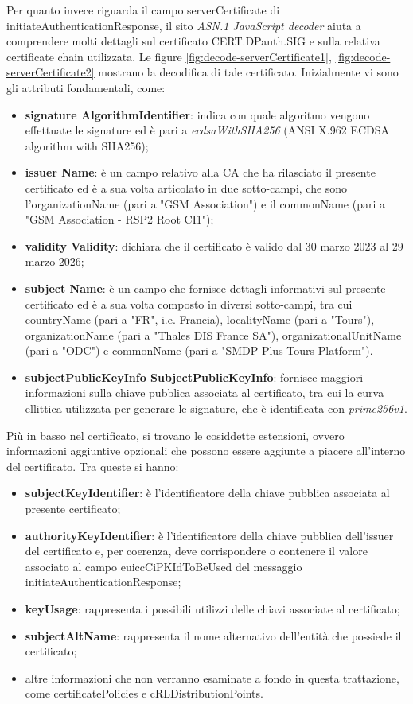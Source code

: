 \documentclass[10pt, oneside]{book}
\begin{document}
Per quanto invece riguarda il campo serverCertificate di initiateAuthenticationResponse, il sito \textit{ASN.1 JavaScript decoder} aiuta a comprendere molti dettagli sul certificato CERT.DPauth.SIG e sulla relativa certificate chain utilizzata. Le figure \ref{fig:decode-serverCertificate1}, \ref{fig:decode-serverCertificate2} mostrano la decodifica di tale certificato. Inizialmente vi sono gli attributi fondamentali, come:
\begin{itemize}
\item \textbf{signature AlgorithmIdentifier}: indica con quale algoritmo vengono effettuate le signature ed è pari a \textit{ecdsaWithSHA256} (ANSI X.962 ECDSA algorithm with SHA256);
\item \textbf{issuer Name}: è un campo relativo alla CA che ha rilasciato il presente certificato ed è a sua volta articolato in due sotto-campi, che sono l'organizationName (pari a "GSM Association") e il commonName (pari a "GSM Association - RSP2 Root CI1");
\item \textbf{validity Validity}: dichiara che il certificato è valido dal 30 marzo 2023 al 29 marzo 2026;
\item \textbf{subject Name}: è un campo che fornisce dettagli informativi sul presente certificato ed è a sua volta composto in diversi sotto-campi, tra cui countryName (pari a "FR", i.e. Francia), localityName (pari a "Tours"), organizationName (pari a "Thales DIS France SA"), organizationalUnitName (pari a "ODC") e commonName (pari a "SMDP Plus Tours Platform").
\item \textbf{subjectPublicKeyInfo SubjectPublicKeyInfo}: fornisce maggiori informazioni sulla chiave pubblica associata al certificato, tra cui la curva ellittica utilizzata per generare le signature, che è identificata con \textit{prime256v1}.
\end{itemize}
Più in basso nel certificato, si trovano le cosiddette estensioni, ovvero informazioni aggiuntive opzionali che possono essere aggiunte a piacere all'interno del certificato. Tra queste si hanno:
\begin{itemize}
\item \textbf{subjectKeyIdentifier}: è l'identificatore della chiave pubblica associata al presente certificato;
\item \textbf{authorityKeyIdentifier}: è l'identificatore della chiave pubblica dell'issuer del certificato e, per coerenza, deve corrispondere o contenere il valore associato al campo euiccCiPKIdToBeUsed del messaggio initiateAuthenticationResponse;
\item \textbf{keyUsage}: rappresenta i possibili utilizzi delle chiavi associate al certificato;
\item \textbf{subjectAltName}: rappresenta il nome alternativo dell'entità che possiede il certificato;
\item altre informazioni che non verranno esaminate a fondo in questa trattazione, come certificatePolicies e cRLDistributionPoints.
\end{itemize}
\end{document}
